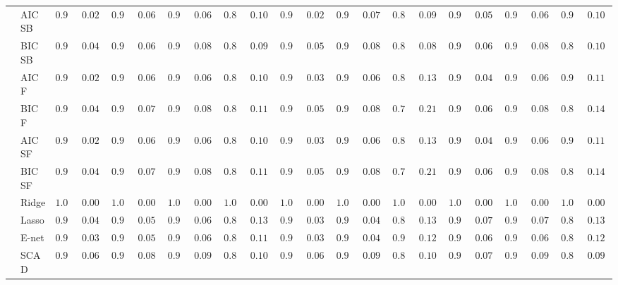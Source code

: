 \begin{tabular}{ll|ll|llllll|llllll|llllll}
 & AIC SB  & $0.998$ & $0.0200$ & $0.980$ & $0.0603$ & $0.978$ & $0.0629$ & $0.898$ & $0.1005$ & $0.996$ & $0.0281$ & $0.970$ & $0.0718$ & $0.868$ & $0.0952$ & $0.986$ & $0.0513$ & $0.978$ & $0.0629$ & $0.910$ & $0.1040$ \\
 & BIC SB  & $0.990$ & $0.0438$ & $0.972$ & $0.0697$ & $0.960$ & $0.0804$ & $0.860$ & $0.0921$ & $0.986$ & $0.0513$ & $0.950$ & $0.0870$ & $0.842$ & $0.0867$ & $0.978$ & $0.0629$ & $0.952$ & $0.0858$ & $0.872$ & $0.1006$ \\
 & AIC F  & $0.998$ & $0.0200$ & $0.980$ & $0.0603$ & $0.978$ & $0.0629$ & $0.898$ & $0.1005$ & $0.994$ & $0.0343$ & $0.972$ & $0.0697$ & $0.858$ & $0.1342$ & $0.988$ & $0.0477$ & $0.974$ & $0.0676$ & $0.902$ & $0.1155$ \\
 & BIC F  & $0.990$ & $0.0438$ & $0.970$ & $0.0718$ & $0.958$ & $0.0819$ & $0.832$ & $0.1162$ & $0.982$ & $0.0575$ & $0.948$ & $0.0882$ & $0.718$ & $0.2148$ & $0.978$ & $0.0629$ & $0.948$ & $0.0882$ & $0.840$ & $0.1477$ \\
 & AIC SF  & $0.998$ & $0.0200$ & $0.980$ & $0.0603$ & $0.978$ & $0.0629$ & $0.898$ & $0.1005$ & $0.994$ & $0.0343$ & $0.972$ & $0.0697$ & $0.854$ & $0.1329$ & $0.988$ & $0.0477$ & $0.972$ & $0.0697$ & $0.902$ & $0.1155$ \\
 & BIC SF  & $0.990$ & $0.0438$ & $0.970$ & $0.0718$ & $0.958$ & $0.0819$ & $0.832$ & $0.1162$ & $0.982$ & $0.0575$ & $0.948$ & $0.0882$ & $0.718$ & $0.2148$ & $0.978$ & $0.0629$ & $0.948$ & $0.0882$ & $0.840$ & $0.1477$ \\
 & Ridge  & $1.000$ & $0.0000$ & $1.000$ & $0.0000$ & $1.000$ & $0.0000$ & $1.000$ & $0.0000$ & $1.000$ & $0.0000$ & $1.000$ & $0.0000$ & $1.000$ & $0.0000$ & $1.000$ & $0.0000$ & $1.000$ & $0.0000$ & $1.000$ & $0.0000$ \\
 & Lasso  & $0.990$ & $0.0438$ & $0.984$ & $0.0545$ & $0.972$ & $0.0697$ & $0.878$ & $0.1360$ & $0.992$ & $0.0394$ & $0.988$ & $0.0477$ & $0.890$ & $0.1314$ & $0.968$ & $0.0737$ & $0.962$ & $0.0789$ & $0.856$ & $0.1336$ \\
 & E-net  & $0.992$ & $0.0394$ & $0.986$ & $0.0513$ & $0.976$ & $0.0653$ & $0.896$ & $0.1188$ & $0.994$ & $0.0343$ & $0.990$ & $0.0438$ & $0.908$ & $0.1285$ & $0.972$ & $0.0697$ & $0.972$ & $0.0697$ & $0.870$ & $0.1283$ \\
 & SCAD  & $0.976$ & $0.0653$ & $0.960$ & $0.0804$ & $0.928$ & $0.0965$ & $0.868$ & $0.1072$ & $0.976$ & $0.0653$ & $0.940$ & $0.0921$ & $0.846$ & $0.1058$ & $0.966$ & $0.0755$ & $0.930$ & $0.0959$ & $0.862$ & $0.0972$ \\

\end{tabular}
